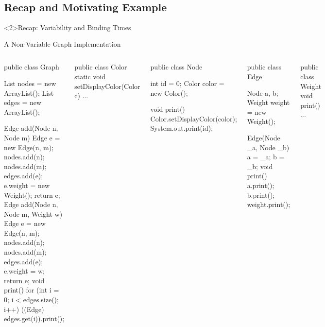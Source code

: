 


\subsection{Recap and Motivating Example}

\begin{frame}<2>{Recap: Variability and Binding Times}
	\frameVariabilityAndBindingTimes
\end{frame}

\begin{frame}[fragile]{A Non-Variable Graph Implementation}
	\begin{tiny}
		\begin{columns}
\begin{codetight}{}
public class Graph {
	List nodes = new ArrayList();
	List edges = new ArrayList();

	Edge add(Node n, Node m) {
		Edge e = new Edge(n, m);
		nodes.add(n); nodes.add(m); edges.add(e);
		e.weight = new Weight();
		return e;
	}
	Edge add(Node n, Node m, Weight w) {
		Edge e = new Edge(n, m);
		nodes.add(n); nodes.add(m); edges.add(e);
		e.weight = w;
		return e;
	}
	void print() {
		for (int i = 0; i < edges.size(); i++) {
			((Edge) edges.get(i)).print();
		}
	}
}
\end{codetight}
\begin{codetight}{}
public class Color {
	static void setDisplayColor(Color c) {...}
}
\end{codetight}	
\begin{codetight}{}
public class Node {
	int id = 0;
	Color color = new Color();

	void print() {
		Color.setDisplayColor(color);
		System.out.print(id);
	}
}
\end{codetight}
\begin{codetight}{}
public class Edge {
	Node a, b;
	Weight weight = new Weight();

	Edge(Node _a, Node _b) {
		a = _a; b = _b;
	}
	void print() {
		a.print(); b.print();
		weight.print();
	}
}
\end{codetight}
\begin{codetight}{}
public class Weight {
	void print() {...}
}
\end{codetight}
		\end{columns}
	\end{tiny}
\end{frame}

